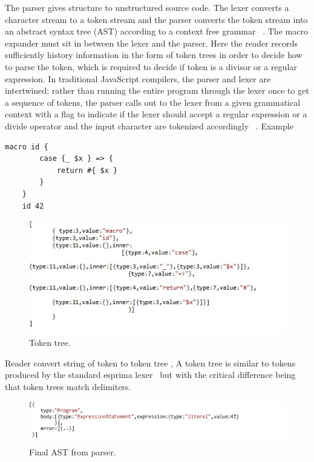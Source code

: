 The parser gives structure to unstructured source code. The lexer converts a character stream to a token stream and the parser converts the token stream into an abstract syntax tree (AST) according to a context free grammar ~\cite{bib2}. The macro expander  must sit in between the lexer and the parser. Here the reader records sufficiently history information in the form of token trees in order to decide how to parse the token, which is required to decide if token is a divisor or a regular expression.
In traditional JavaScript compilers, the parser and lexer are intertwined; rather than running the entire program through the lexer once to get a sequence of tokens, the parser calls out to the lexer from a given grammatical context with a flag to indicate if the lexer should accept a regular expression or a divide operator and the input character are tokenized accordingly ~\cite{bib2}.
\newpage
Example

\begin{lstlisting}[frame=single]
	macro id {
  		case {_ $x } => {
   			return #{ $x }
  		}
	}
	id 42
\end{lstlisting}

\begin{figure}[htb]
\centering
\includegraphics[width=1.0\textwidth]{images/readeroutput.jpg}
\caption{Token tree.} 
\label{fig:readeroutput}
\end{figure}
Reader convert string of token to token tree , A token tree is similar to tokens produced by the standard esprima lexer~\cite{bib7} but with the critical difference being that token trees match delimiters. 
\begin{figure}[htb]
\centering
\includegraphics[width=1.0\textwidth]{images/AST.jpg}
\caption{Final AST from parser.} 
\label{fig:AST}

\end{figure}

